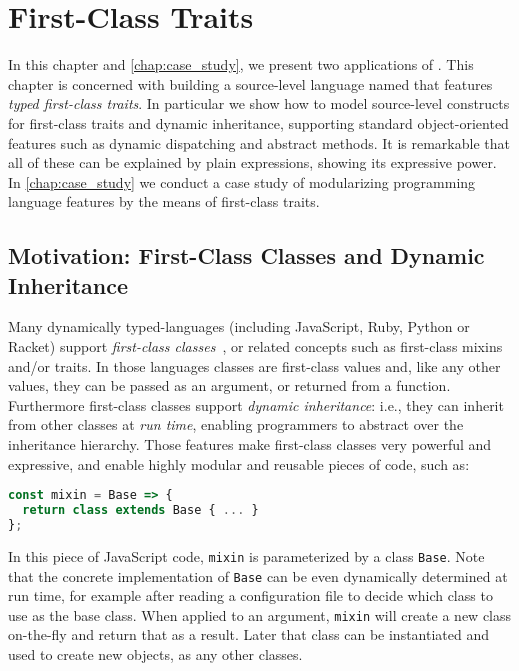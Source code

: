 \chapter{First-Class Traits}
\label{chap:traits}

\renewcommand\ottaltinferrule[4]{
  \inferrule*[narrower=0.9,lab=#1,#2]
    {#3}
    {#4}
}

In this chapter and \cref{chap:case_study}, we present two applications of
\fnamee. This chapter is concerned with building a source-level language named
\sedel that features \textit{typed first-class traits}. In particular we show
how to model source-level constructs for first-class traits and dynamic
inheritance, supporting standard object-oriented features such as dynamic
dispatching and abstract methods. It is remarkable that all of these can be
explained by plain \fnamee expressions, showing its expressive power.
In \cref{chap:case_study} we conduct a case study of modularizing programming
language features by the means of first-class traits.



\section{Motivation: First-Class Classes and Dynamic Inheritance}

Many dynamically typed-languages (including JavaScript, Ruby, Python
or Racket) support \emph{first-class classes}~\citep{DBLP:conf/aplas/FlattFF06}, or related concepts
such as first-class mixins and/or traits. In those languages classes
are first-class values and, like any other values, they can be
passed as an argument, or returned from a function. Furthermore
first-class classes support \emph{dynamic inheritance}: i.e., they
can inherit from other classes at \emph{run time}, enabling
programmers to abstract over the inheritance hierarchy.
Those features make first-class classes very powerful and expressive,
and enable highly modular and reusable pieces of code, such as:
\begin{lstlisting}[language=JavaScript]
const mixin = Base => {
  return class extends Base { ... }
};
\end{lstlisting}
In this piece of JavaScript code, \lstinline{mixin} is
parameterized by a class \lstinline{Base}. Note that the concrete
implementation of \lstinline{Base} can be
even dynamically determined at run time, for example
after reading a configuration file to decide which
class to use as the base class.  When applied to an argument,
\lstinline{mixin} will create a new class on-the-fly and return that
as a result. Later that class can be instantiated and used to create
new objects, as any other classes.


